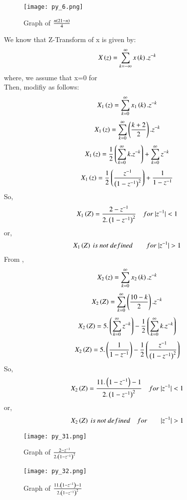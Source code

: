 \documentclass[beamer]{IEEEtran}
\theoremstyle{remark}
\begin{document}
\begin{figure}[h]
    \centering
    \texttt{[image: py\_6.png]}
    \label{fig:enter-label}
    \caption*{Graph of $\frac{n\left(21-n\right)}{4}$}
\end{figure}
We know that Z-Transform of x is given by:
\begin{align}
\label{q11}
    X\left(z\right)=\sum_{k=-\infty}^{\infty} x\left(k\right).z^{-k}
\end{align}
where, we assume that x=0   for \\
Then, \brak{\ref{q11}} modifiy as follows:
\begin{align}
\label{q12}
    X_1\left(z\right)=\sum_{k=0}^{\infty} x_1\left(k\right).z^{-k}
\end{align}
\begin{align}X_1\left(z\right)=\sum_{k=0}^{\infty} \left(\frac{k+2}{2}\right).z^{-k}\end{align}
\begin{align}
    \label{q13}
    X_1\left(z\right)=\frac{1}{2}\left(\sum_{k=0}^{\infty}k.z^{-k}\right)+\sum_{k=0}^{\infty}z^{-k}
\end{align}
\begin{align}
    \label{q13}
    X_1\left(z\right)=\frac{1}{2}\left(\frac{z^{-1}}{\left(1-z^{-1}\right)^2}\right)+\frac{1}{1-z^{-1}}
\end{align}
So,
\begin{align} X_1\left(Z\right)=\frac{2-z^{-1}}{2.\left(1-z^{-1}\right)^2}\quad for\ |z^{-1}|<1\end{align}
or,
\begin{align}
X_1\brak{Z}\ is\ not\ defined\qquad for\ |z^{-1}|>1 
\end{align}
From \brak{\ref{q12}},
\begin{align}
    X_2\left(z\right)=\sum_{k=0}^{\infty} x_2\left(k\right).z^{-k}
\end{align}
\begin{align}X_2\left(Z\right)=\sum_{k=0}^{\infty} \left(\frac{10-k}{2}\right).z^{-k}\end{align}
\begin{align}X_2\left(Z\right)=5.\left(\sum_{k=0}^{\infty}z^{-k}\right)-\frac{1}{2}\left(\sum_{k=0}^{\infty}k.z^{-k}\right)\end{align}
\begin{align}X_2\left(Z\right)=5.\left(\frac{1}{1-z^{-1}}\right)-\frac{1}{2}\left(\frac{z^{-1}}{\left(1-z^{-1}\right)^2}\right)\end{align}
So,
\begin{align}X_2\brak{Z}=\frac{11.\brak{1-z^{-1}}-1}{2.\brak{1-z^{-1}}^2}\quad for\ |z^{-1}|<1\end{align}
or,
\begin{align}X_2\brak{Z}\ is\ not\ defined\quad for\qquad |z^{-1}|>1\end{align}
\begin{figure}[h]
    \centering
    \texttt{[image: py\_31.png]}
    \label{fig:enter-label}
    \caption*{Graph of $\frac{2-z^{-1}}{2.\left(1-z^{-1}\right)^2}$}
\end{figure}
\begin{figure}[h]
    \centering
    \texttt{[image: py\_32.png]}
    \label{fig:enter-label}
    \caption*{Graph of $\frac{11.\left(1-z^{-1}\right)-1}{2.\left(1-z^{-1}\right)^2}$}
\end{figure}
\end{document}

